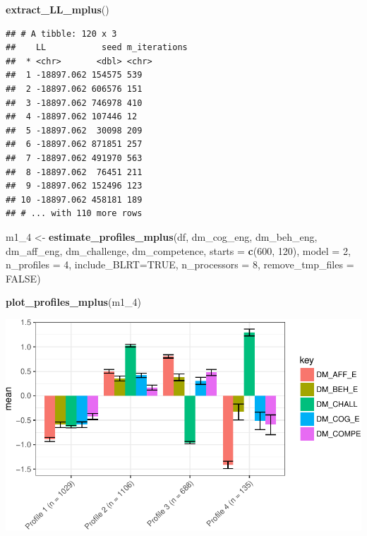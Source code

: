 \documentclass[]{msu-thesis}
\newenvironment{Shaded}{\begin{snugshade}}{\end{snugshade}}
\newcommand{\KeywordTok}[1]{\textcolor[rgb]{0.13,0.29,0.53}{\textbf{#1}}}
\newcommand{\DataTypeTok}[1]{\textcolor[rgb]{0.13,0.29,0.53}{#1}}
\newcommand{\DecValTok}[1]{\textcolor[rgb]{0.00,0.00,0.81}{#1}}
\newcommand{\StringTok}[1]{\textcolor[rgb]{0.31,0.60,0.02}{#1}}
\newcommand{\OtherTok}[1]{\textcolor[rgb]{0.56,0.35,0.01}{#1}}
\newcommand{\NormalTok}[1]{#1}
\theoremstyle{definition}
\theoremstyle{definition}
\theoremstyle{definition}
\theoremstyle{remark}
\begin{document}
\begin{Shaded}
\begin{Highlighting}[]
\KeywordTok{extract_LL_mplus}\NormalTok{()}
\end{Highlighting}
\end{Shaded}

\begin{verbatim}
## # A tibble: 120 x 3
##    LL           seed m_iterations
##  * <chr>       <dbl> <chr>       
##  1 -18897.062 154575 539         
##  2 -18897.062 606576 151         
##  3 -18897.062 746978 410         
##  4 -18897.062 107446 12          
##  5 -18897.062  30098 209         
##  6 -18897.062 871851 257         
##  7 -18897.062 491970 563         
##  8 -18897.062  76451 211         
##  9 -18897.062 152496 123         
## 10 -18897.062 458181 189         
## # ... with 110 more rows
\end{verbatim}

\begin{Shaded}
\begin{Highlighting}[]
\NormalTok{m1_}\DecValTok{4}\NormalTok{ <-}\StringTok{ }\KeywordTok{estimate_profiles_mplus}\NormalTok{(df,  }
\NormalTok{                             dm_cog_eng, dm_beh_eng, dm_aff_eng, dm_challenge, dm_competence,}
                             \DataTypeTok{starts =} \KeywordTok{c}\NormalTok{(}\DecValTok{600}\NormalTok{, }\DecValTok{120}\NormalTok{),}
                             \DataTypeTok{model =} \DecValTok{2}\NormalTok{,}
                             \DataTypeTok{n_profiles =} \DecValTok{4}\NormalTok{,}
                             \DataTypeTok{include_BLRT=}\OtherTok{TRUE}\NormalTok{,}
                             \DataTypeTok{n_processors =} \DecValTok{8}\NormalTok{, }\DataTypeTok{remove_tmp_files =} \OtherTok{FALSE}\NormalTok{)}

\KeywordTok{plot_profiles_mplus}\NormalTok{(m1_}\DecValTok{4}\NormalTok{)}
\end{Highlighting}
\end{Shaded}

\includegraphics{rosenberg-dissertation_files/figure-latex/spec-solutions-model2-4-1.pdf}
\end{document}
